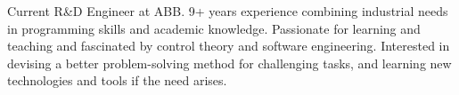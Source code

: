 

\begin{cvparagraph}

Current R\&D Engineer at ABB. 9+ years experience combining industrial needs in programming skills and academic knowledge.
Passionate for learning and teaching and fascinated by control theory and software engineering.
Interested in devising a better problem-solving method for challenging tasks, and
learning new technologies and tools if the need arises.
\end{cvparagraph}
